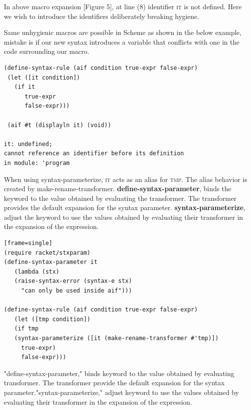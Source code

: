 \newpage

In above macro expansion [Figure 5], at line (8) identifier \textsc{it} is not defined. Here we wish to introduce the identifiers deliberately breaking hygiene. 

Same unhygienic macros are possible in Scheme as shown in the below example, mistake is if our new syntax introduces a variable that conflicts with one in the code surrounding our macro.

\begin{lstlisting}[frame=single]
(define-syntax-rule (aif condition true-expr false-expr)
 (let ([it condition])
   (if it
      true-expr
      false-expr)))

 (aif #t (displayln it) (void))

it: undefined;
cannot reference an identifier before its definition
in module: 'program
\end{lstlisting}

When using syntax-parameterize, \textsc{it} acts as an alias for \textsc{tmp}. The alias behavior is created by make-rename-transformer. \textbf{define-syntax-parameter}, binds the keyword to the value obtained by evaluating the transformer. The transformer provides the default expansion for the syntax parameter. \textbf{syntax-parameterize}, adjust the keyword to use the values obtained by evaluating their transformer in the expansion of the expression. 

\begin{lstlisting}[frame=single][frame=single]
(require racket/stxparam)
(define-syntax-parameter it
   (lambda (stx)
   (raise-syntax-error (syntax-e stx)
     "can only be used inside aif")))

(define-syntax-rule (aif condition true-expr false-expr)
   (let ([tmp condition])
   (if tmp
   (syntax-parameterize ([it (make-rename-transformer #'tmp)])
     true-expr)
     false-expr)))
\end{lstlisting}
"define-syntax-parameter," binds keyword to the value obtained by evaluating transformer. The transformer provide the default expansion for the syntax parameter."syntax-parameterize," adjust keyword to use the values obtained by evaluating their transformer in the expansion of the expression. 
